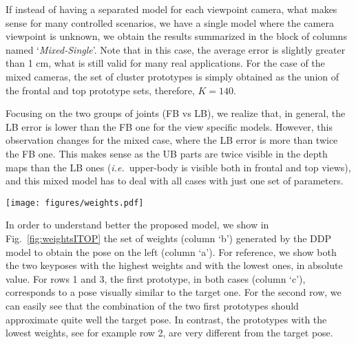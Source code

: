 \documentclass[review,12pt,3p]{elsarticle}
\def \ie{\textit{i.e.}}
\begin{document}
If instead of having a separated model for each viewpoint camera, what makes sense for many controlled scenarios, we have a single model where the camera viewpoint is unknown, we obtain the results summarized in the block of columns named `\textit{Mixed-Single}'. Note that in this case, the average error is slightly greater than 1 cm, what is still valid for many real applications. For the case of the mixed cameras, the set of cluster prototypes is simply obtained as the union of the frontal and top prototype sets, therefore, $K=140$.

Focusing on the two groups of joints (FB vs LB), we realize that, in general, the LB error is lower than the FB one for the view specific models. However, this observation changes for the mixed case, where the LB error is more than twice the FB one. This makes sense as the UB parts are twice visible in the depth maps than the LB ones (\ie~upper-body is visible both in frontal and top views), and this mixed model has to deal with all cases with just one set of parameters.

\begin{figure*}[tbhp]
\centering
   \texttt{[image: figures/weights.pdf]}
   \caption{\textbf{Weights and prototype poses from ITOP}.
   \textbf{(a)} Target pose. \textbf{(b)} Weight estimated for each prototype pose ($K=70$). \textbf{(c)} to \textbf{(f)} Prototype poses sorted by decreasing absolute value of its weight.
   If the weight is positive, the trunk segments and the joints are drawn in green, otherwise, they are drawn in black. Best viewed in color.
   }
   \label{fig:weightsITOP}
\end{figure*}

In order to understand better the proposed model, we show in Fig.~\ref{fig:weightsITOP} the set of weights (column `b') generated by the DDP model to obtain the pose on the left (column `a'). For reference, we show both the two keyposes with the highest weights and with the lowest ones, in absolute value. For rows 1 and 3, the first prototype, in both cases (column `c'), corresponds to a pose visually similar to the target one. For the second row, we can easily see that the combination of the two first prototypes should approximate quite well the target pose. In contrast, the prototypes with the lowest weights, see for example row 2, are very different from the target pose.
\end{document}
